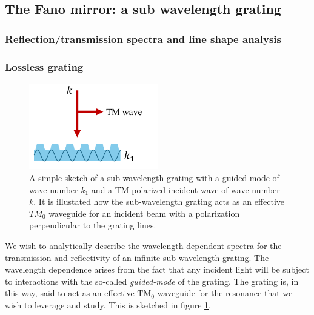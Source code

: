 \subsection{The Fano mirror: a sub wavelength grating}\label{sec:fano_mirror}

\subsubsection{Reflection/transmission spectra and line shape analysis}

\subsubsection{Lossless grating}

\begin{figure}[h!]
    \centering
    \includegraphics[width=0.5\textwidth]{figures/TM0_waveguide.pdf}
    \caption{A simple sketch of a sub-wavelength grating with a guided-mode of wave number $k_1$ and a TM-polarized incident wave of wave number $k$. It is illustated how the sub-wavelength grating acts as an effective $TM_0$ waveguide for an incident beam with a polarization perpendicular to the grating lines.}
    \label{fig:TM0_waveguide}
\end{figure}

We wish to analytically describe the wavelength-dependent spectra for the transmission and reflectivity of an infinite sub-wavelength grating. The wavelength dependence arises from the fact that any incident light will be subject to interactions with the so-called \emph{guided-mode} of the grating. The grating is, in this way, said to act as an effective $\text{TM}_0$ waveguide for the resonance that we wish to leverage and study. This is sketched in figure \ref{fig:TM0_waveguide}. 

